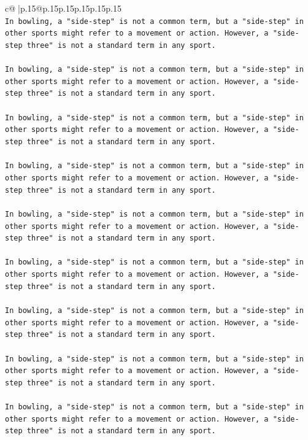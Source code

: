 \documentclass{article}
\begin{document}
{\begin{supertabular}{c@{$\;$}|p{.15\linewidth}@{}p{.15\linewidth}p{.15\linewidth}p{.15\linewidth}p{.15\linewidth}p{.15\linewidth}}
{{{\\ 
\texttt{In bowling, a "side{-}step" is not a common term, but a "side{-}step" in other sports might refer to a movement or action. However, a "side{-}step three" is not a standard term in any sport. } \\
\\ 
\texttt{In bowling, a "side{-}step" is not a common term, but a "side{-}step" in other sports might refer to a movement or action. However, a "side{-}step three" is not a standard term in any sport. } \\
\\ 
\texttt{In bowling, a "side{-}step" is not a common term, but a "side{-}step" in other sports might refer to a movement or action. However, a "side{-}step three" is not a standard term in any sport. } \\
\\ 
\texttt{In bowling, a "side{-}step" is not a common term, but a "side{-}step" in other sports might refer to a movement or action. However, a "side{-}step three" is not a standard term in any sport. } \\
\\ 
\texttt{In bowling, a "side{-}step" is not a common term, but a "side{-}step" in other sports might refer to a movement or action. However, a "side{-}step three" is not a standard term in any sport. } \\
\\ 
\texttt{In bowling, a "side{-}step" is not a common term, but a "side{-}step" in other sports might refer to a movement or action. However, a "side{-}step three" is not a standard term in any sport. } \\
\\ 
\texttt{In bowling, a "side{-}step" is not a common term, but a "side{-}step" in other sports might refer to a movement or action. However, a "side{-}step three" is not a standard term in any sport. } \\
\\ 
\texttt{In bowling, a "side{-}step" is not a common term, but a "side{-}step" in other sports might refer to a movement or action. However, a "side{-}step three" is not a standard term in any sport. } \\
\\ 
\texttt{In bowling, a "side{-}step" is not a common term, but a "side{-}step" in other sports might refer to a movement or action. However, a "side{-}step three" is not a standard term in any sport. } \\
\\ 
}}}
\end{supertabular}}
\end{document}
